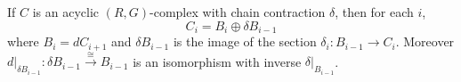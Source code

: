 If $C$ is an acyclic $(R,G)$-complex with chain contraction $\delta$, then for each $i$,
$$C_i = B_i \oplus \delta B_{i-1}$$
where $B_i = d C_{i+1}$ and $\delta B_{i-1}$ is the image of the section $\delta_i: B_{i-1} \rightarrow C_i$. Moreover $d|_{\delta B_{i-1}}: \delta B_{i-1} \xrightarrow{\cong} B_{i-1}$ is an isomorphism with inverse $\delta|_{B_{i-1}}$.
